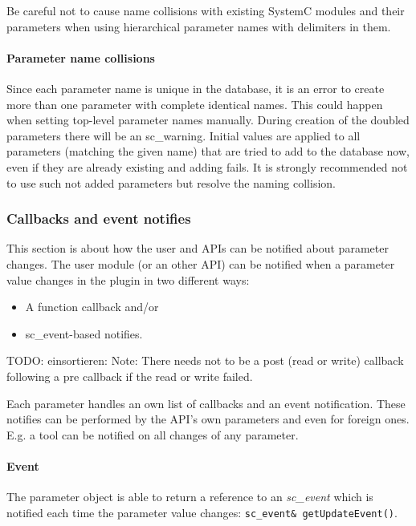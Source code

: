 \WarningSymbol{} Be careful not to cause name collisions with existing SystemC modules and their parameters when using hierarchical parameter names with delimiters in them.

\paragraph{Parameter name collisions} Since each parameter name is unique in the database, it is an error to create more than one parameter with complete identical names. This could happen when setting top-level parameter names manually. During creation of the doubled parameters there will be an sc\_warning. Initial values are applied to all parameters (matching the given name) that are tried to add to the database now, even if they are already existing and adding fails. It is strongly recommended not to use such not added parameters but resolve the naming collision.


\subsubsection{Callbacks and event notifies}
\label{CallbacksAndNotifies}

This section is about how the user and APIs can be notified about parameter changes. The user module (or an other API) can be notified when a parameter value changes in the plugin in two different ways:

\begin{itemize}
	\item A function callback and/or
	\item sc\_event-based notifies.
\end{itemize}

TODO: einsortieren:
Note: There needs not to be a post (read or write) callback following a pre callback if the read or write failed.

Each parameter handles an own list of callbacks and an event notification.
These notifies can be performed by the API's own parameters and even for foreign ones. E.g. a tool can be notified on all changes of any parameter.

\paragraph{Event} The parameter object is able to return a reference to an {\em sc\_event} which is notified each time the parameter value changes: \lstinline|sc_event& getUpdateEvent()|.

